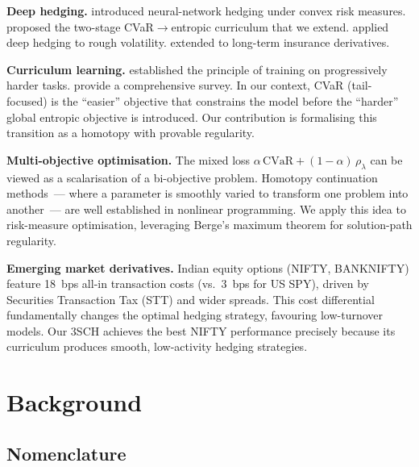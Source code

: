 \documentclass[11pt]{article}
\newcommand{\cvar}{\mathrm{CVaR}}
\begin{document}
\textbf{Deep hedging.}
\citet{buehler2019deep} introduced neural-network hedging under convex risk measures. \citet{kozyra2019deep} proposed the two-stage CVaR$\to$entropic curriculum that we extend. \citet{horvath2021deep} applied deep hedging to rough volatility. \citet{carbonneau2021deep} extended to long-term insurance derivatives.

\textbf{Curriculum learning.}
\citet{bengio2009curriculum} established the principle of training on progressively harder tasks. \citet{soviany2022curriculum} provide a comprehensive survey. In our context, CVaR (tail-focused) is the ``easier'' objective that constrains the model before the ``harder'' global entropic objective is introduced. Our contribution is formalising this transition as a homotopy with provable regularity.

\textbf{Multi-objective optimisation.}
The mixed loss $\alpha\,\cvar + (1-\alpha)\,\rho_\lambda$ can be viewed as a scalarisation of a bi-objective problem. Homotopy continuation methods~--- where a parameter is smoothly varied to transform one problem into another~--- are well established in nonlinear programming. We apply this idea to risk-measure optimisation, leveraging Berge's maximum theorem for solution-path regularity.

\textbf{Emerging market derivatives.}
Indian equity options (NIFTY, BANKNIFTY) feature 18~bps all-in transaction costs (vs.\ 3~bps for US SPY), driven by Securities Transaction Tax (STT) and wider spreads. This cost differential fundamentally changes the optimal hedging strategy, favouring low-turnover models. Our 3SCH achieves the best NIFTY performance precisely because its curriculum produces smooth, low-activity hedging strategies.

\section{Background}
\label{sec:background}

\subsection{Nomenclature}
\end{document}
